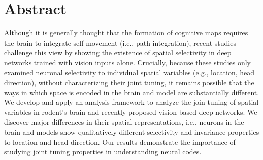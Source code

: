 \documentclass[11pt]{article}
\begin{document}
\section*{Abstract}
Although it is generally thought that the formation of cognitive maps requires the brain to integrate self-movement (i.e., path integration), recent studies challenge this view by showing the existence of spatial selectivity in deep networks trained with vision inputs alone. 
Crucially, because these studies only examined neuronal selectivity to individual spatial variables (e.g., location, head direction), without characterizing their joint tuning,
it remains possible that the ways in which space is encoded in the brain and model are substantially different. 
We develop and apply an analysis framework to analyze the join tuning of spatial variables in rodent's brain and recently proposed vision-based deep networks. We discover major differences in their spatial representations, i.e., neurons in the brain and models show qualitatively different selectivity and invariance properties to location and head direction.  Our results demonstrate the importance of studying joint tuning properties in understanding neural codes.
\end{document}
